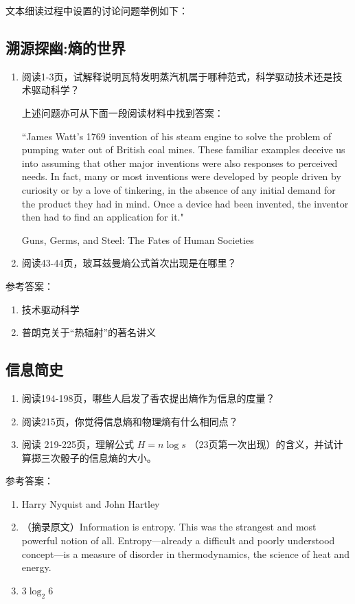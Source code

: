 \documentclass[12pt]{ctexart}
\begin{document}
文本细读过程中设置的讨论问题举例如下：


\subsection{溯源探幽:熵的世界}
\begin{enumerate}
  \item 阅读1-3页，试解释说明瓦特发明蒸汽机属于哪种范式，科学驱动技术还是技术驱动科学？

  上述问题亦可从下面一段阅读材料中找到答案：
  
  ``James Watt’s 1769 invention of his steam engine to solve the problem of pumping water out of British coal mines.
  These familiar examples deceive us into assuming that other major inventions were also responses to perceived needs. In fact, many or most inventions were developed by people driven by curiosity or by a love of tinkering, in the absence of any initial demand for the product they had in mind. Once a device had been invented, the inventor then had to find an application for it."
  \begin{flushright}
  Guns, Germs, and Steel: The Fates of Human Societies
  \end{flushright}
  \item 阅读43-44页，玻耳兹曼熵公式首次出现是在哪里？
\end{enumerate}

参考答案：
\begin{enumerate}
  \item 技术驱动科学
  \item 普朗克关于“热辐射”的著名讲义
\end{enumerate}

\subsection{信息简史}
\begin{enumerate}
  \item 阅读194-198页，哪些人启发了香农提出熵作为信息的度量？
  \item 阅读215页，你觉得信息熵和物理熵有什么相同点？
  \item 阅读 219-225页，理解公式 $H=n\log s$ （23页第一次出现）的含义，并试计算掷三次骰子的信息熵的大小。
\end{enumerate}

参考答案：
\begin{enumerate}
  \item Harry Nyquist and John Hartley
  \item （摘录原文）Information is entropy. This was the strangest and most powerful notion of all. Entropy—already a difficult and poorly understood concept—is a measure of disorder in thermodynamics, the science of heat and energy.
  \item $3\log_2 6$
\end{enumerate}
\end{document}
